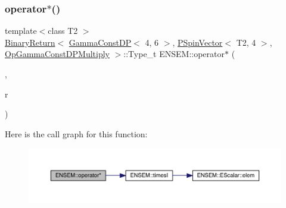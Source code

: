 \subsubsection{\texorpdfstring{operator$\ast$()}{operator*()}\hspace{0.1cm}{\footnotesize\ttfamily [23/32]}}
{\footnotesize\ttfamily template$<$class T2 $>$ \\
\mbox{\hyperlink{structENSEM_1_1BinaryReturn}{Binary\+Return}}$<$ \mbox{\hyperlink{classENSEM_1_1GammaConstDP}{Gamma\+Const\+DP}}$<$ 4, 6 $>$, \mbox{\hyperlink{classENSEM_1_1PSpinVector}{P\+Spin\+Vector}}$<$ T2, 4 $>$, \mbox{\hyperlink{structENSEM_1_1OpGammaConstDPMultiply}{Op\+Gamma\+Const\+D\+P\+Multiply}} $>$\+::Type\+\_\+t E\+N\+S\+E\+M\+::operator$\ast$ (\begin{DoxyParamCaption}\item[{const \mbox{\hyperlink{classENSEM_1_1GammaConstDP}{Gamma\+Const\+DP}}$<$ 4, 6 $>$ \&}]{,  }\item[{const \mbox{\hyperlink{classENSEM_1_1PSpinVector}{P\+Spin\+Vector}}$<$ T2, 4 $>$ \&}]{r }\end{DoxyParamCaption})\hspace{0.3cm}{\ttfamily [inline]}}

Here is the call graph for this function\+:\nopagebreak
\begin{figure}[H]
\begin{center}
\leavevmode
\includegraphics[width=350pt]{dd/d6d/group__primspinvector_ga118f057eadddaebf7485ca26d25ad24f_cgraph}
\end{center}
\end{figure}
\mbox{\label{group__primspinvector_ga06f03963e659581745493e56edf21491}} 
